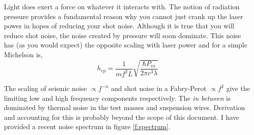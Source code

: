 Light does exert a force on whatever it interacts with.  The
notion of radiation pressure provides a fundamental reason
why you cannot just crank up the laser power in hopes of
reducing your shot noise.  Although it is true that you will
reduce shot noise, the noise created by pressure will soon
dominate.  This noise has (as you would expect) the opposite
scaling with laser power \cite{Saulson} and for a simple Michelson
is,
\begin{equation}
h_{rp} = \frac{1}{mf^2L}\sqrt{\frac{\hbar P_{in}}{2\pi c^3 \lambda}}
\end{equation}

The scaling of seismic noise $\propto f^{-n}$ and shot noise
in a Fabry-Perot $\propto f^2$ give the limiting low and high frequency components respectively.  The \emph{in between} is dominated by
thermal noise in the test masses and suspension wires. 
Derivation and accounting for this is probably beyond the
scope of this document.  I have provided a recent noise
spectrum in figure \ref{f:spectrum}.


